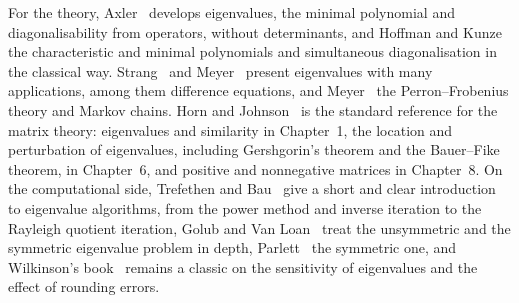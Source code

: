 For the theory, Axler~\cite[Chaps.~5 and~8]{axler2024} develops eigenvalues, the minimal polynomial and diagonalisability from operators, without determinants, and Hoffman and Kunze~\cite[Chap.~6]{hoffman1971} the characteristic and minimal polynomials and simultaneous diagonalisation in the classical way. Strang~\cite[Chap.~6]{strang2016} and Meyer~\cite[Chap.~7]{meyer2000} present eigenvalues with many applications, among them difference equations, and Meyer~\cite[Chap.~8]{meyer2000} the Perron--Frobenius theory and Markov chains. Horn and Johnson~\cite{horn2013} is the standard reference for the matrix theory: eigenvalues and similarity in Chapter~1, the location and perturbation of eigenvalues, including Gershgorin's theorem and the Bauer--Fike theorem, in Chapter~6, and positive and nonnegative matrices in Chapter~8. On the computational side, Trefethen and Bau~\cite[Lectures~24--27]{trefethen1997} give a short and clear introduction to eigenvalue algorithms, from the power method and inverse iteration to the Rayleigh quotient iteration, Golub and Van Loan~\cite[Chaps.~7 and~8]{golub2013} treat the unsymmetric and the symmetric eigenvalue problem in depth, Parlett~\cite{parlett1998} the symmetric one, and Wilkinson's book~\cite{wilkinson1965} remains a classic on the sensitivity of eigenvalues and the effect of rounding errors.

\chapterreferences
